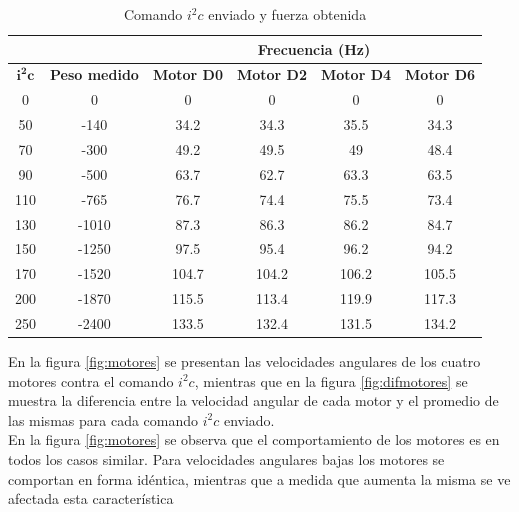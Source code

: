 \documentclass[main]{subfiles}
\begin{document}
\begin{table}[H]
\centering
\begin{tabular}{|c|c|c|c|c|c|} 
	\cline{3-6} \multicolumn{1}{c}{} & \multicolumn{1}{c}{} & 
	\multicolumn{4}{|c|}{\cellcolor[gray]{0.6}Frecuencia (Hz)} \\ \hline
	\cellcolor[gray]{0.8} {$\mathbf{i^2c}$} & 
	\cellcolor[gray]{0.8} \textbf{Peso medido} &
	\cellcolor[gray]{0.8} \textbf{Motor D0} &
	\cellcolor[gray]{0.8} \textbf{Motor D2} &
	\cellcolor[gray]{0.8} \textbf{Motor D4} &
	\cellcolor[gray]{0.8} \textbf{Motor D6}   \\ \hline \hline
	  0 &      0 &    0 &    0 &    0 &    0 \\ \hline
	 50 &-140 & 34.2 & 34.3 & 35.5 & 34.3 \\ \hline
	 70 &-300 & 49.2 & 49.5 &   49 & 48.4 \\ \hline
	 90 & -500 & 63.7 & 62.7 & 63.3 & 63.5 \\ \hline
	110 & -765 & 76.7 & 74.4 & 75.5 & 73.4 \\ \hline
	130 &  -1010 & 87.3 & 86.3 & 86.2 & 84.7 \\ \hline
	150 & -1250 & 97.5 & 95.4 & 96.2 & 94.2 \\ \hline
	170 & -1520 &104.7 &104.2 &106.2 &105.5 \\ \hline
	200 & -1870 &115.5 &113.4 &119.9 &117.3 \\ \hline
	250 &  -2400 &133.5 &132.4 &131.5 &134.2 \\ \hline
\end{tabular}
\caption{Comando $i^2c$ enviado y fuerza obtenida}
\label{tab:motores}
\end{table}

En la figura \ref{fig:motores} se presentan las velocidades angulares de los cuatro motores contra el comando $i^2c$, mientras que en la figura \ref{fig:difmotores} se muestra la diferencia entre la velocidad angular de cada motor y el promedio de las mismas para cada comando $i^2c$ enviado.\\
En la figura \ref{fig:motores} se observa que el comportamiento de los motores es en todos los casos similar. Para velocidades angulares bajas los motores se comportan en forma id\'entica, mientras que a medida que aumenta la misma se ve afectada esta caracter\'istica\\
 
\end{document}
